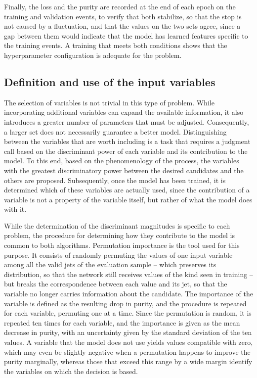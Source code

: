 Finally, the loss and the purity are recorded at the end of each epoch on the training and validation events, to verify that both stabilize, so that the stop is not caused by a fluctuation, and that the values on the two sets agree, since a gap between them would indicate that the model has learned features specific to the training events. A training that meets both conditions shows that the hyperparameter configuration is adequate for the problem.


\subsection{Definition and use of the input variables}
\label{subsec:featimp}
The selection of variables is not trivial in this type of problem. While incorporating additional variables can expand the available information, it also introduces a greater number of parameters that must be adjusted. Consequently, a larger set does not necessarily guarantee a better model. Distinguishing between the variables that are worth including is a task that requires a judgment call based on the discriminant power of each variable and its contribution to the model. To this end, based on the phenomenology of the process, the variables with the greatest discriminatory power between the desired candidates and the others are proposed. Subsequently, once the model has been trained, it is determined which of these variables are actually used, since the contribution of a variable is not a property of the variable itself, but rather of what the model does with it.\medskip

While the determination of the discriminant magnitudes is specific to each problem, the procedure for determining how they contribute to the model is common to both algorithms. Permutation importance \cite{Breiman2001} is the tool used for this purpose. It consists of randomly permuting the values of one input variable among all the valid jets of the evaluation sample -- which preserves its distribution, so that the network still receives values of the kind seen in training -- but breaks the correspondence between each value and its jet, so that the variable no longer carries information about the candidate. The importance of the variable is defined as the resulting drop in purity, and the procedure is repeated for each variable, permuting one at a time. Since the permutation is random, it is repeated ten times for each variable, and the importance is given as the mean decrease in purity, with an uncertainty given by the standard deviation of the ten values. A variable that the model does not use yields values compatible with zero, which may even be slightly negative when a permutation happens to improve the purity marginally, whereas those that exceed this range by a wide margin identify the variables on which the decision is based.


